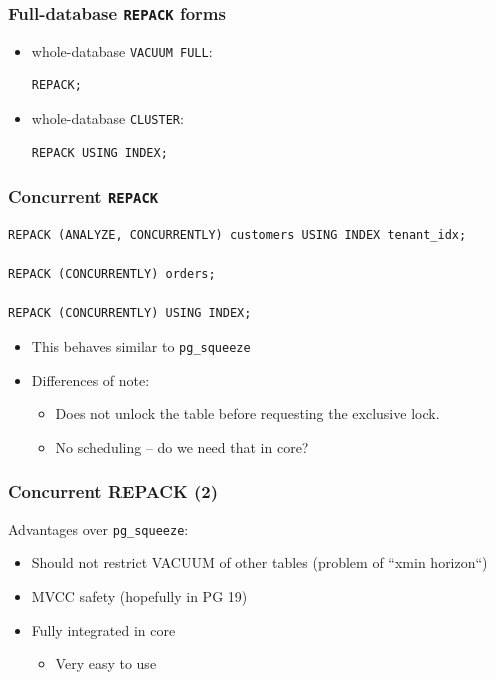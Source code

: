 \begin{frame}[fragile]
  \frametitle{Full-database \texttt{REPACK} forms}
  \begin{itemize}
    \item whole-database \texttt{VACUUM FULL}:
      \begin{lstlisting}
REPACK;
      \end{lstlisting}
    \item whole-database \texttt{CLUSTER}:
      \begin{lstlisting}
REPACK USING INDEX;
      \end{lstlisting}
  \end{itemize}
\end{frame}

\begin{frame}[fragile]
  \frametitle{Concurrent \texttt{REPACK}}
  \begin{lstlisting}
REPACK (ANALYZE, CONCURRENTLY) customers USING INDEX tenant_idx;

REPACK (CONCURRENTLY) orders;

REPACK (CONCURRENTLY) USING INDEX;
  \end{lstlisting}
  \begin{itemize}
    \item This behaves similar to \texttt{pg\_squeeze}
    \item Differences of note:
      \begin{itemize}
	\item Does not unlock the table before requesting the exclusive lock.
	\item No scheduling -- do we need that in core?
      \end{itemize}
  \end{itemize}
\end{frame}

\begin{frame}
  \frametitle{Concurrent REPACK (2)}

  Advantages over \texttt{pg\_squeeze}:

  \begin{itemize}
    \item Should not restrict VACUUM of other tables (problem of ``xmin
      horizon``)
    \item MVCC safety (hopefully in PG 19)
    \item Fully integrated in core
    \begin{itemize} \item Very easy to use \end{itemize}
  \end{itemize}
\end{frame}

